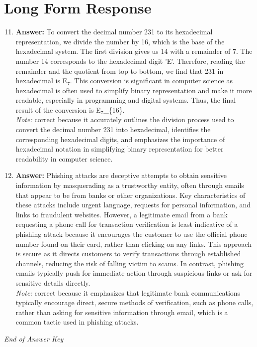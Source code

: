 \documentclass[12pt]{article}
\begin{document}
\section*{Long Form Response}
\begin{enumerate}[label=\arabic*.]
\setcounter{enumi}{10}
\item \textbf{Answer:} To convert the decimal number 231 to its hexadecimal representation, we divide the number by 16, which is the base of the hexadecimal system. The first division gives us 14 with a remainder of 7. The number 14 corresponds to the hexadecimal digit 'E'. Therefore, reading the remainder and the quotient from top to bottom, we find that 231 in hexadecimal is E$_{7}$. This conversion is significant in computer science as hexadecimal is often used to simplify binary representation and make it more readable, especially in programming and digital systems. Thus, the final result of the conversion is E$_{7}$\_\{16\}.
\\ \textit{Note:} correct because it accurately outlines the division process used to convert the decimal number 231 into hexadecimal, identifies the corresponding hexadecimal digits, and emphasizes the importance of hexadecimal notation in simplifying binary representation for better readability in computer science.
\item \textbf{Answer:} Phishing attacks are deceptive attempts to obtain sensitive information by masquerading as a trustworthy entity, often through emails that appear to be from banks or other organizations. Key characteristics of these attacks include urgent language, requests for personal information, and links to fraudulent websites. However, a legitimate email from a bank requesting a phone call for transaction verification is least indicative of a phishing attack because it encourages the customer to use the official phone number found on their card, rather than clicking on any links. This approach is secure as it directs customers to verify transactions through established channels, reducing the risk of falling victim to scams. In contrast, phishing emails typically push for immediate action through suspicious links or ask for sensitive details directly.
\\ \textit{Note:} correct because it emphasizes that legitimate bank communications typically encourage direct, secure methods of verification, such as phone calls, rather than asking for sensitive information through email, which is a common tactic used in phishing attacks.
\end{enumerate}

\vfill
\noindent\textit{End of Answer Key}
\end{document}
